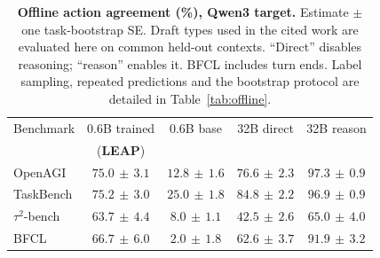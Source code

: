 \begin{table}[htbp]
\centering\small\setlength{\tabcolsep}{5pt}
\caption{\textbf{Offline action agreement (\%), Qwen3 target.} Estimate $\pm$ one task-bootstrap SE.
Draft types used in the cited work are evaluated here on common held-out contexts.
``Direct'' disables reasoning; ``reason'' enables it. BFCL includes turn ends.
Label sampling, repeated predictions and the bootstrap protocol are detailed in Table~\ref{tab:offline}.}
\label{tab:offline_main}
\begin{tabular*}{\linewidth}{@{\extracolsep{\fill}}lcccc@{}}
\toprule
Benchmark & 0.6B trained & 0.6B base & 32B direct & 32B reason \\
 & {\scriptsize (\textbf{LEAP})} & {\scriptsize\citep{smc}}
 & {\scriptsize\citep{isp,dsp}}
 & {\scriptsize\citep{spork,swyr}} \\
\midrule
OpenAGI & $75.0\,\pm\,3.1$ & $12.8\,\pm\,1.6$ & $76.6\,\pm\,2.3$ & $97.3\,\pm\,0.9$ \\
TaskBench & $75.2\,\pm\,3.0$ & $25.0\,\pm\,1.8$ & $84.8\,\pm\,2.2$ & $96.9\,\pm\,0.9$ \\
$\tau^2$-bench & $63.7\,\pm\,4.4$ & $8.0\,\pm\,1.1$ & $42.5\,\pm\,2.6$ & $65.0\,\pm\,4.0$ \\
BFCL & $66.7\,\pm\,6.0$ & $2.0\,\pm\,1.8$ & $62.6\,\pm\,3.7$ & $91.9\,\pm\,3.2$ \\
\bottomrule
\end{tabular*}
\end{table}
